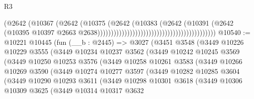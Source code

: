 \begin{lexlean}{R3}
\begin{coremodule}
                                                                        (@2642
                                                                          (@10367
                                                                            (@2642
                                                                              (@10375
                                                                                (@2642
                                                                                  (@10383
                                                                                    (@2642
                                                                                      (@10391
                                                                                        (@2642
                                                                                          (@10395
                                                                                            @10397
                                                                                            @2663
                                                                                            @2638))))))))))))))))))))))))))))))))))))))))))))
@10540 := @10221
    @10445
    (fun (__b : @2445) =>
    @3027
      (@3451
        @3548
        (@3449
          @10226
          @10229
          @3555
          (@3449
            @10234
            @10237
            @3562
            (@3449
              @10242
              @10245
              @3569
              (@3449
                @10250
                @10253
                @3576
                (@3449
                  @10258
                  @10261
                  @3583
                  (@3449
                    @10266
                    @10269
                    @3590
                    (@3449
                      @10274
                      @10277
                      @3597
                      (@3449
                        @10282
                        @10285
                        @3604
                        (@3449
                          @10290
                          @10293
                          @3611
                          (@3449
                            @10298
                            @10301
                            @3618
                            (@3449
                              @10306
                              @10309
                              @3625
                              (@3449
                                @10314
                                @10317
                                @3632

\end{coremodule}
\end{lexlean}
